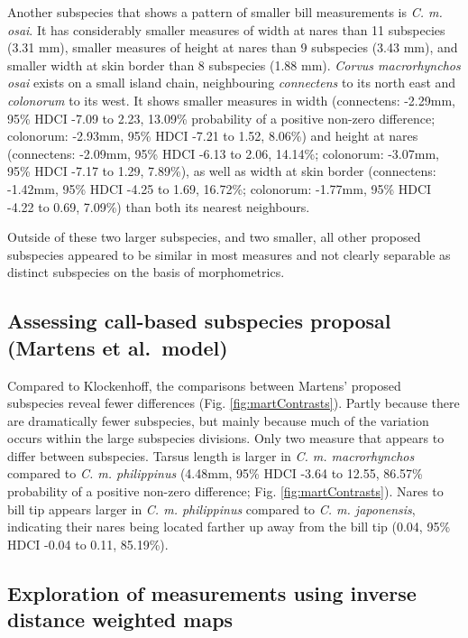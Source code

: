 \documentclass[10pt,a4paper]{article}
\begin{document}
Another subspecies that shows a pattern of smaller bill measurements is \emph{C. m. osai}.
It has considerably smaller measures of width at nares than 11 subspecies (3.31 mm), smaller measures of height at nares than 9 subspecies (3.43 mm), and smaller width at skin border than 8 subspecies (1.88 mm).
\emph{Corvus macrorhynchos osai} exists on a small island chain, neighbouring \emph{connectens} to its north east and \emph{colonorum} to its west.
It shows smaller measures in width (connectens: -2.29mm, 95\% HDCI -7.09 to 2.23, 13.09\% probability of a positive non-zero difference; colonorum: -2.93mm, 95\% HDCI -7.21 to 1.52, 8.06\%) and height at nares (connectens: -2.09mm, 95\% HDCI -6.13 to 2.06, 14.14\%; colonorum: -3.07mm, 95\% HDCI -7.17 to 1.29, 7.89\%), as well as width at skin border (connectens: -1.42mm, 95\% HDCI -4.25 to 1.69, 16.72\%; colonorum: -1.77mm, 95\% HDCI -4.22 to 0.69, 7.09\%) than both its nearest neighbours.

Outside of these two larger subspecies, and two smaller, all other proposed subspecies appeared to be similar in most measures and not clearly separable as distinct subspecies on the basis of morphometrics.

\subsection{Assessing call-based subspecies proposal (Martens et al.~model)}\label{assessing-call-based-subspecies-proposal-martens-et-al.-model}

Compared to Klockenhoff, the comparisons between Martens' proposed subspecies reveal fewer differences (Fig. \ref{fig:martContrasts}).
Partly because there are dramatically fewer subspecies, but mainly because much of the variation occurs within the large subspecies divisions.
Only two measure that appears to differ between subspecies.
Tarsus length is larger in \emph{C. m. macrorhynchos} compared to \emph{C. m. philippinus} (4.48mm, 95\% HDCI -3.64 to 12.55, 86.57\% probability of a positive non-zero difference; Fig. \ref{fig:martContrasts}).
Nares to bill tip appears larger in \emph{C. m. philippinus} compared to \emph{C. m. japonensis}, indicating their nares being located farther up away from the bill tip (0.04, 95\% HDCI -0.04 to 0.11, 85.19\%).

\subsection{Exploration of measurements using inverse distance weighted maps}\label{exploration-of-measurements-using-inverse-distance-weighted-maps}
\end{document}
